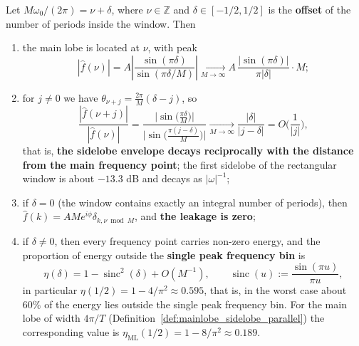 \begin{theorem}\label{thm:leakage_envelope_parallel}
Let $M\omega_0/(2\pi)=\nu+\delta$, where $\nu\in\mathbb{Z}$ and $\delta\in[-1/2,1/2]$ is the \textbf{offset} of the number of periods inside the window. Then
\begin{enumerate}[label=(\roman*)]
    \item the main lobe is located at $\nu$, with peak
    \[
    |\hat f(\nu)|=A\left|\frac{\sin(\pi\delta)}{\sin(\pi\delta/M)}\right|\xrightarrow[M\to\infty]{}A\,\frac{|\sin(\pi\delta)|}{\pi|\delta|}\cdot M;
    \]
    \item for $j\ne0$ we have $\theta_{\nu+j}=\frac{2\pi}{M}(\delta-j)$, so
    \[
    \frac{|\hat f(\nu+j)|}{|\hat f(\nu)|}
    =\frac{\big|\sin\big(\tfrac{\pi\delta}{M}\big)\big|}{\big|\sin\big(\tfrac{\pi(j-\delta)}{M}\big)\big|}
    \xrightarrow[M\to\infty]{}\frac{|\delta|}{|j-\delta|}=O\!\Big(\frac{1}{|j|}\Big),
    \]
    that is, \textbf{the sidelobe envelope decays reciprocally with the distance from the main frequency point}; the first sidelobe of the rectangular window is about $-13.3$ dB and decays as $|\omega|^{-1}$;
    \item if $\delta=0$ (the window contains exactly an integral number of periods), then $\hat f(k)=A M e^{i\phi}\delta_{k,\nu\bmod M}$, and \textbf{the leakage is zero};
    \item if $\delta\ne0$, then every frequency point carries non-zero energy, and the proportion of energy outside the \textbf{single peak frequency bin} is
    \[
    \eta(\delta)=1-\operatorname{sinc}^2(\delta)+O(M^{-1}),
    \qquad \operatorname{sinc}(u):=\frac{\sin(\pi u)}{\pi u},
    \]
    in particular $\eta(1/2)=1-4/\pi^2\approx0.595$, that is, in the worst case about $60\%$ of the energy lies outside the single peak frequency bin. For the main lobe of width $4\pi/T$ (Definition~\ref{def:mainlobe_sidelobe_parallel}) the corresponding value is $\eta_{\text{ML}}(1/2)=1-8/\pi^2\approx0.189$.
\end{enumerate}
\end{theorem}


